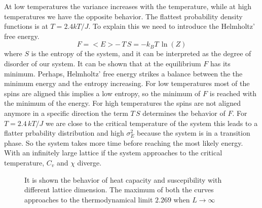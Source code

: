 \documentclass[%
preprint,
 amsmath,amssymb,
 aps,
]{revtex4-1}
\theoremstyle{plain}
\theoremstyle{definition}
\theoremstyle{plain}
\begin{document}
At low temperatures the variance increases with the temperature, while at high temperatures we have the opposite behavior. The flattest probability density functions is at $T=2.4 kT/J$. To explain this we need to introduce the Helmholtz’ free energy.
\begin{equation}
\label{helmoltze}
F = <E> - \, T \, S = -k_B T \, \ln(Z)
\end{equation}
where $S$ is the entropy of the system, and it can be interpreted as the degree of disorder of our system. It can be shown that at the equilibrium $F$ has its minimum. 
Perhaps, Helmholtz’ free energy strikes a balance between the the minimum energy and the entropy increasing. 
For low temperatures most of the spins are aligned this implies a low entropy, so the minimum of $F$ is reached with the minimum of the energy. For high temperatures the spins are not aligned anymore in a specific direction the term $T \, S$ determines the behavior of $F$. For $T=2.4 \, kT/J$ we are close to the critical temperature of the system this leads to a flatter prbability distribution and high $\sigma^2_E$ because the system is in a transition phase. So the system takes more time before reaching the most likely energy. \\
With an infinitely large lattice if the system approaches to the critical temperature, $C_v$ and $\chi$ diverge.\\
\begin{figure}[h!]
\centering
\caption{It is shown the behavior of heat capacity and suscepibility with different lattice dimension. The maximum of both the curves approaches to the thermodynamical limit $2.269$ when $L \to \infty$}
\end{figure}
\end{document}
